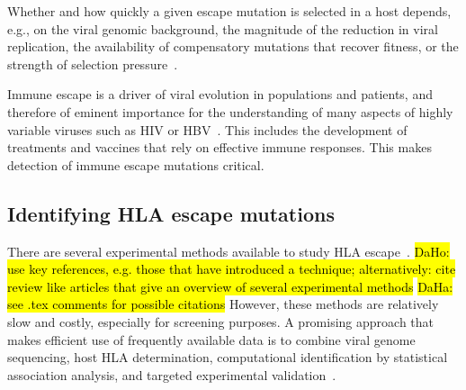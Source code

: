 \documentclass{bioinfo}
\begin{document}
Whether and how quickly a given escape mutation is selected in a host depends, e.g., on the viral genomic background, the magnitude of the reduction in viral replication, the availability of compensatory mutations that recover fitness, or the strength of selection pressure~\citep{Kloverpris2016}.

Immune escape is a driver of viral evolution in populations and patients, and therefore of eminent importance for the understanding of many aspects of highly variable viruses such as HIV or HBV~\citep{Alizon2011, Allen2005, Rousseau2008, Lumley2018}. This includes the development of treatments and vaccines that rely on effective immune responses. This makes detection of immune escape mutations critical.

\subsection{Identifying HLA escape mutations}

There are several experimental methods available to study HLA escape~\citep{Timm2004}.  \hl{DaHo: use key references, e.g. those that have introduced a technique; alternatively: cite review like articles that give an overview of several experimental methods} \hl{DaHa: see .tex comments for possible citations} However, these methods are relatively slow and costly, especially for screening purposes. A promising approach that makes efficient use of frequently available data is to combine viral genome sequencing, host HLA determination, computational identification by statistical association analysis, and targeted experimental validation~\citep{Carlson2012}.




\end{document}

